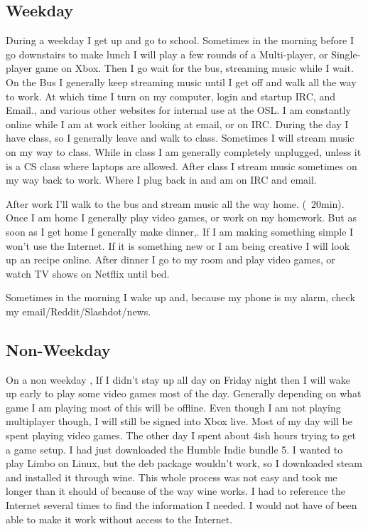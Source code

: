 \documentclass[12pt,letterpaper]{article}
\begin{document}
\subsection{Weekday}
During a weekday I get up and go to school. Sometimes in the morning
before I go downstairs to make lunch I will play a few rounds of a
Multi-player, or Single-player game on Xbox. Then I go wait for the bus,
streaming music while I wait. On the Bus I generally keep streaming
music until I get off and walk all the way to work. At which time I
turn on my computer, login and startup IRC, and Email., and various
other websites for internal use at the OSL. I am constantly online while
I am at work either looking at email, or on IRC. During the day I have
class, so I generally leave and walk to class. Sometimes I will stream
music on my way to class. While in class I am generally completely
unplugged, unless it is a CS class where laptops are allowed.  After
class I stream music sometimes on my way back to work.  Where I plug
back in and am on IRC and email.

After work I'll walk to the bus and stream music all the way home.
(~20min). Once I am home I generally play video games, or work on my
homework. But as soon as I get home I generally make dinner,. If I am
making something simple I won't use the Internet. If it is something new
or I am being creative I will look up an recipe online. After dinner I
go to my room and play video games, or watch TV shows on Netflix until
bed.

Sometimes in the morning I wake up and, because my phone is my alarm,
check my email/Reddit/Slashdot/news.


\subsection{Non-Weekday}

On a non weekday , If I didn't stay up all day on Friday night then I
will wake up early to play some video games most of the day. Generally
depending on what game I am playing most of this will be offline. Even
though I am not playing multiplayer though, I will still be signed into
Xbox live. Most of my day will be spent playing video games. The other
day I spent about 4ish hours trying to get a game setup. I had just
downloaded the Humble Indie bundle 5. I wanted to play Limbo on Linux, but
the deb package wouldn't work, so I downloaded steam and installed it
through wine. This whole process was not easy and took me longer than it
should of because of the way wine works. I had to reference the Internet
several times to find the information I needed. I would not have of been
able to make it work without access to the Internet.
\end{document}
